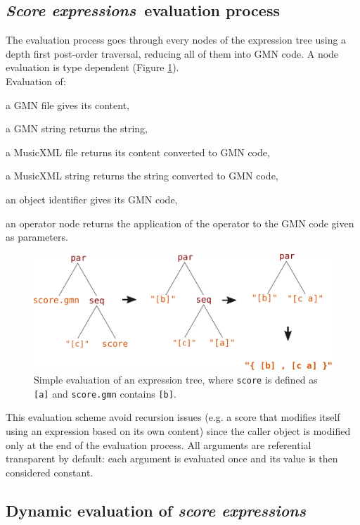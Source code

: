 \documentclass{article}
\newcommand{\OSC}[1]{\texttt{#1}}
\newcommand{\sExpr}{\emph{score expressions}}
\newcommand{\SExpr}{\emph{Score expressions}}
\let\olditemize\itemize
\let\oldenditemize\enditemize
\renewenvironment{itemize} 	{\olditemize \setlength{\itemsep}{1mm}}{\oldenditemize}
\begin{document}
\subsection{\SExpr\ evaluation process}
The evaluation process goes through every nodes of the expression tree using a depth first post-order traversal, reducing all of them into GMN code.
A node evaluation is type dependent (Figure \ref{fig:classicEval}). \\
Evaluation of:  
\begin{itemize}
\item a GMN file gives its content,
\item a GMN string returns the string,
\item a MusicXML file returns its content converted to GMN code,
\item a MusicXML string returns the string converted to GMN code,
\item an object identifier gives its GMN code,
\item an operator node returns the application of the operator to the GMN code given as parameters.
\end{itemize}

\begin{figure}[th]
\centering
\includegraphics[width=1\columnwidth]{imgs/classicEval}
\caption{Simple evaluation of an expression tree,
where \OSC{score} is defined as \OSC{[a]}
and \OSC{score.gmn} contains \OSC{[b]}.
\label{fig:classicEval} }
\end{figure}

This evaluation scheme avoid recursion issues (e.g. a score that modifies itself using an expression based on its own content) since the caller object is modified only at the end of the evaluation process. All arguments are referential transparent by default: each argument is evaluated once and its value is then considered constant.

\subsection{Dynamic evaluation of \sExpr}
\end{document}
